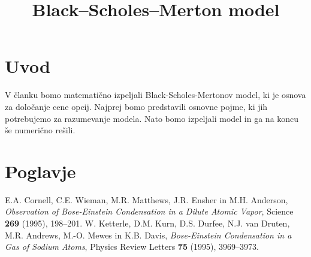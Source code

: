 \documentclass[twoside,11pt]{article}
\begin{document}



\klasifikacija{~} 
\title{Black–Scholes–Merton model}
\abstract{}

\glava\baselineskip=14.5pt

\smallskip

\section{Uvod}
    V članku bomo matematično izpeljali Black-Scholes-Mertonov model, ki je osnova za določanje cene opcij. Najprej bomo predstavili osnovne pojme, ki jih potrebujemo za razumevanje modela. Nato bomo izpeljali model in ga na koncu še numerično rešili.

\section{Poglavje}



\begin{thebibliography}{99}

 E.A. Cornell, C.E. Wieman, M.R. Matthews, J.R. Ensher in M.H. Anderson, \emph{Observation of Bose-Einstein Condensation in a Dilute Atomic Vapor}, Science \textbf{269} (1995), 198--201. 
 W. Ketterle, D.M. Kurn, D.S. Durfee, N.J. van Druten, M.R. Andrews, M.-O. Mewes in K.B. Davis, \emph{Bose-Einstein Condensation in a Gas of Sodium Atoms}, Physics Review Letters \textbf{75} (1995), 3969--3973. 


\end{thebibliography}
\end{document}
